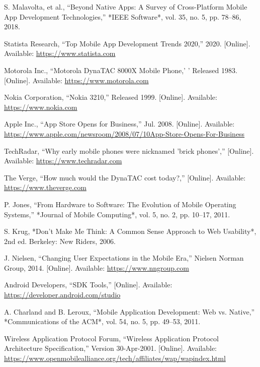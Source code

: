 \documentclass[12pt]{report}
\begin{document}
\begin{thebibliography}{1}
  S. Malavolta, et al., ``Beyond Native Apps: A Survey of Cross-Platform Mobile App Development Technologies,'' *IEEE Software*, vol. 35, no. 5, pp. 78–86, 2018.

  Statista Research, ``Top Mobile App Development Trends 2020,'' 2020. [Online]. Available: \url{https://www.statista.com}

  Motorola Inc., ``Motorola DynaTAC 8000X Mobile Phone,'  ' Released 1983. [Online]. Available: \url{https://www.motorola.com}

  Nokia Corporation, ``Nokia 3210,'' Released 1999. [Online]. Available: \url{https://www.nokia.com}

  Apple Inc., ``App Store Opens for Business,'' Jul. 2008. [Online]. Available: \url{https://www.apple.com/newsroom/2008/07/10App-Store-Opens-For-Business}


  TechRadar, ``Why early mobile phones were nicknamed 'brick phones','' [Online]. Available: \url{https://www.techradar.com}

  The Verge, ``How much would the DynaTAC cost today?,'' [Online]. Available: \url{https://www.theverge.com}

  P. Jones, ``From Hardware to Software: The Evolution of Mobile Operating Systems,'' *Journal of Mobile Computing*, vol. 5, no. 2, pp. 10–17, 2011.

  S. Krug, *Don't Make Me Think: A Common Sense Approach to Web Usability*, 2nd ed. Berkeley: New Riders, 2006.

  J. Nielsen, ``Changing User Expectations in the Mobile Era,'' Nielsen Norman Group, 2014. [Online]. Available: \url{https://www.nngroup.com}

  Android Developers, ``SDK Tools,'' [Online]. Available: \url{https://developer.android.com/studio}

  A. Charland and B. Leroux, ``Mobile Application Development: Web vs. Native,'' *Communications of the ACM*, vol. 54, no. 5, pp. 49–53, 2011.

  Wireless Application Protocol Forum, ``Wireless Application Protocol Architecture Specification,'' Version 30-Apr-2001. [Online]. Available: \url{https://www.openmobilealliance.org/tech/affiliates/wap/wapindex.html}


\end{thebibliography}
\end{document}
